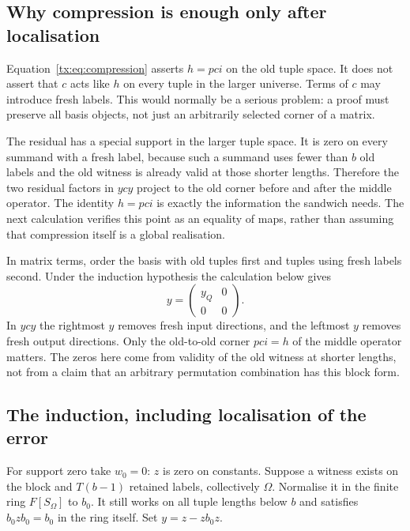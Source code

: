 \subsection{Why compression is enough only after localisation}
Equation~\eqref{tx:eq:compression} asserts $h=pci$ on the old tuple
space. It does not assert that $c$ acts like $h$ on every tuple in
the larger universe. Terms of $c$ may introduce fresh labels. This
would normally be a serious problem: a proof must preserve all basis
objects, not just an arbitrarily selected corner of a matrix.

The residual has a special support in the larger tuple space. It is
zero on every summand with a fresh label, because such a summand uses
fewer than $b$ old labels and the old witness is already valid at
those shorter lengths. Therefore the two residual factors in
$ycy$ project to the old corner before and after the middle operator.
The identity $h=pci$ is exactly the information the sandwich needs.
The next calculation verifies this point as an equality of maps,
rather than assuming that compression itself is a global realisation.

In matrix terms, order the basis with old tuples first and tuples
using fresh labels second. Under the induction hypothesis the
calculation below gives
\[
                       y=\begin{pmatrix}y_Q&0\\0&0\end{pmatrix}.
\]
In $ycy$ the rightmost $y$ removes fresh input directions, and the
leftmost $y$ removes fresh output directions. Only the old-to-old
corner $pci=h$ of the middle operator matters. The zeros here come
from validity of the old witness at shorter lengths, not from a
claim that an arbitrary permutation combination has this block form.

\subsection{The induction, including localisation of the error}
For support zero take $w_0=0$: $z$ is zero on constants. Suppose a witness exists on the block and $T(b-1)$ retained labels, collectively $\Omega$. Normalise it in the finite ring $F[S_\Omega]$ to $b_0$. It still works on all tuple lengths below $b$ and satisfies $b_0zb_0=b_0$ in the ring itself. Set $y=z-zb_0z$.

